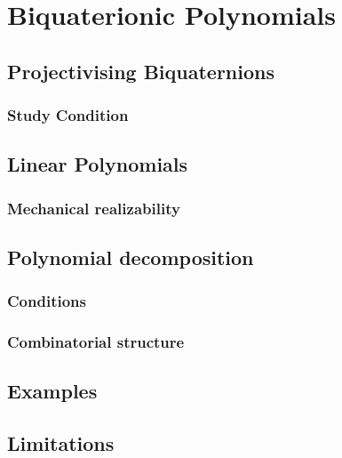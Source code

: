\chapter{Biquaterionic Polynomials}

\section{Projectivising Biquaternions}
\subsection{Study Condition}
\section{Linear Polynomials}
\subsection{Mechanical realizability}
\section{Polynomial decomposition}
\subsection{Conditions}
\subsection{Combinatorial structure}
\section{Examples}

\section{Limitations}
